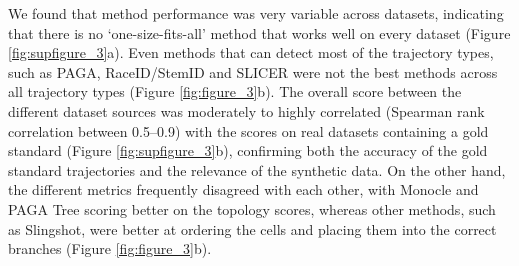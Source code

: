 We found that method performance was very variable across datasets, indicating that there is no ‘one-size-fits-all’ method that works well on every dataset (Figure \ref{fig:supfigure_3}a). Even methods that can detect most of the trajectory types, such as PAGA, RaceID/StemID and SLICER were not the best methods across all trajectory types (Figure \ref{fig:figure_3}b). The overall score between the different dataset sources was moderately to highly correlated (Spearman rank correlation between 0.5–0.9) with the scores on real datasets containing a gold standard (Figure \ref{fig:supfigure_3}b), confirming both the accuracy of the gold standard trajectories and the relevance of the synthetic data. On the other hand, the different metrics frequently disagreed with each other, with Monocle and PAGA Tree scoring better on the topology scores, whereas other methods, such as Slingshot, were better at ordering the cells and placing them into the correct branches (Figure \ref{fig:figure_3}b).

